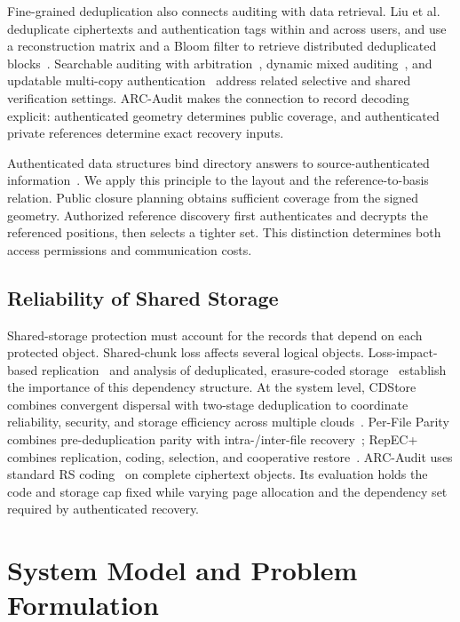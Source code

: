 \documentclass[10pt,journal]{IEEEtran}
\begin{document}
Fine-grained deduplication also connects auditing with data retrieval.
Liu et al. deduplicate ciphertexts and authentication tags within and across
users, and use a reconstruction matrix and a Bloom filter to retrieve distributed
deduplicated blocks~\cite{Liu2025FineGrained}.
Searchable auditing with arbitration~\cite{Miao2025}, dynamic mixed
auditing~\cite{Pan2026}, and updatable multi-copy authentication~\cite{Xu2026MPA}
address related selective and shared verification settings. ARC-Audit makes
the connection to record decoding explicit: authenticated geometry determines
public coverage, and authenticated private references determine exact recovery
inputs.

Authenticated data structures bind directory answers to source-authenticated
information~\cite{Goodrich2003ADS}. We apply this principle to the layout and
the reference-to-basis relation. Public closure planning obtains sufficient
coverage from the signed geometry. Authorized reference discovery first
authenticates and decrypts the referenced positions, then selects a tighter set.
This distinction determines both access permissions and communication costs.

\subsection{Reliability of Shared Storage}
Shared-storage protection must account for the records that depend on
each protected object. Shared-chunk loss affects several logical objects. Loss-impact-based
replication~\cite{Bhagwat2006Reliability} and analysis of deduplicated,
erasure-coded storage~\cite{Li2010Reliability} establish the importance of
this dependency structure. At the system level, CDStore combines convergent
dispersal with two-stage deduplication to coordinate reliability, security,
and storage efficiency across multiple clouds~\cite{Li2015CDStore}.
Per-File Parity combines pre-deduplication parity
with intra-/inter-file recovery~\cite{Wu2019PFP}; RepEC+ combines replication,
coding, selection, and cooperative restore~\cite{Zuo2022RepECPlus}.
ARC-Audit uses standard RS coding~\cite{ReedSolomon1960} on complete ciphertext
objects. Its evaluation holds the code and storage cap fixed while varying
page allocation and the dependency set required by authenticated recovery.

\section{System Model and Problem Formulation}\label{sec:model}
\end{document}
